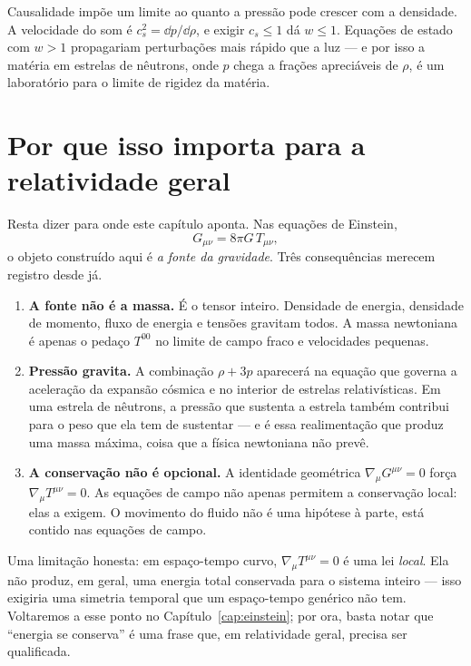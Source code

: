 \documentclass[12pt,a4paper,oneside]{book}
\theoremstyle{rgplain}
\theoremstyle{rgremark}
\begin{document}
\begin{atencao}
Causalidade impõe um limite ao quanto a pressão pode crescer com a densidade.
A velocidade do som é $c_s^2=\dd p/\dd\rho$, e exigir $c_s\le1$ dá
$w\le1$. Equações de estado com $w>1$ propagariam perturbações mais rápido
que a luz --- e por isso a matéria em estrelas de nêutrons, onde $p$ chega a
frações apreciáveis de $\rho$, é um laboratório para o limite de rigidez da
matéria.
\end{atencao}

\section{Por que isso importa para a relatividade geral}
\label{sec:importancia-rg}

Resta dizer para onde este capítulo aponta. Nas equações de Einstein,
\[
  G_{\mu\nu}=8\pi G\,T_{\mu\nu} ,
\]
o objeto construído aqui é \emph{a fonte da gravidade}. Três consequências
merecem registro desde já.

\begin{enumerate}
  \item \textbf{A fonte não é a massa.} É o tensor inteiro. Densidade de
  energia, densidade de momento, fluxo de energia e tensões gravitam todos.
  A massa newtoniana é apenas o pedaço $T^{00}$ no limite de campo fraco e
  velocidades pequenas.

  \item \textbf{Pressão gravita.} A combinação $\rho+3p$ aparecerá na equação
  que governa a aceleração da expansão cósmica e no interior de estrelas
  relativísticas. Em uma estrela de nêutrons, a pressão que sustenta a
  estrela também contribui para o peso que ela tem de sustentar --- e é essa
  realimentação que produz uma massa máxima, coisa que a física newtoniana
  não prevê.

  \item \textbf{A conservação não é opcional.} A identidade geométrica
  $\nabla_\mu G^{\mu\nu}=0$ força $\nabla_\mu T^{\mu\nu}=0$. As equações de
  campo não apenas permitem a conservação local: elas a exigem. O movimento
  do fluido não é uma hipótese à parte, está contido nas equações de campo.
\end{enumerate}

\begin{atencao}
Uma limitação honesta: em espaço-tempo curvo, $\nabla_\mu T^{\mu\nu}=0$ é uma
lei \emph{local}. Ela não produz, em geral, uma energia total conservada para
o sistema inteiro --- isso exigiria uma simetria temporal que um espaço-tempo
genérico não tem. Voltaremos a esse ponto no Capítulo~\ref{cap:einstein};
por ora, basta notar que ``energia se conserva'' é uma frase que, em
relatividade geral, precisa ser qualificada.
\end{atencao}
\end{document}
